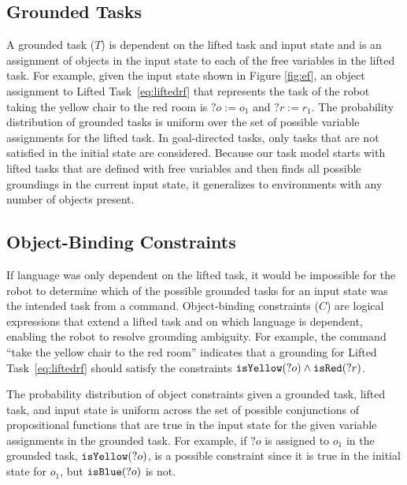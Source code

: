 \documentclass[conference]{IEEEtran}
\begin{document}
\subsection{Grounded Tasks}
A grounded task ($T$) is dependent on the lifted task and input state and is an assignment of objects in the input state to each of the free variables in the lifted task. For example, given the input state shown in Figure \ref{fig:ef}, an object assignment to Lifted Task~\ref{eq:liftedrf} that represents the task of the robot taking the yellow chair to the red room is $?o:=o_1$ and $?r:=r_1$. The probability distribution of grounded tasks is uniform over the set of possible variable assignments for the lifted task. In goal-directed tasks, only tasks that are not satisfied in the initial state are considered.
Because our task model starts with lifted tasks that are defined with free variables and then finds all possible groundings in the current input state, it generalizes to environments with any number of objects present.

\subsection{Object-Binding Constraints}
If language was only dependent on the lifted task, it would be impossible for the robot to determine which of the possible grounded tasks for an input state was the intended task from a command.
Object-binding constraints ($C$) are logical expressions that extend a lifted task and on which language is dependent, enabling the robot to resolve grounding ambiguity. 
For example, the command ``take the yellow chair to the red room'' indicates that a grounding for Lifted Task~\ref{eq:liftedrf} should satisfy the constraints ${\tt isYellow}(?o) \land {\tt isRed}(?r)$.

The probability distribution of object constraints given a grounded task, lifted task, and input state is uniform across the set of possible conjunctions of propositional functions that are true in the input state for the given variable assignments in the grounded task. For example, if $?o$ is assigned to $o_1$ in the grounded task, ${\tt isYellow}(?o)$, is a possible constraint since it is true in the initial state for $o_1$, but ${\tt isBlue}(?o)$ is not.
\end{document}
